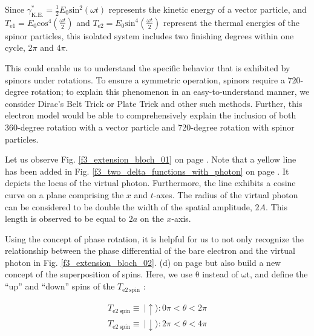 \documentclass[%
 reprint,
 amsmath,amssymb,
 aps,
]{revtex4-1}
\numberwithin{equation}{section}%
\begin{document}
    Since $\gamma^{*}_{\mathrm{K.E.}} = \frac{1}{2} E_{0} \mathrm{sin}^{2} (\omega t)$ represents the kinetic energy of a vector particle, and $T_{\mathrm{e1}} = E_{0} \mathrm{cos}^{4} \left ( \frac{\omega t}{2} \right)$ and $T_{\mathrm{e2}} = E_{0} \mathrm{sin}^{4} \left ( \frac{\omega t}{2} \right)$ represent the thermal energies of the spinor particles, this isolated system includes two finishing degrees within one cycle, $2\pi$ and $4\pi$.

    This could enable us to understand the specific behavior that is exhibited by spinors under rotations. To ensure a symmetric operation, spinors require a 720-degree rotation; to explain this phenomenon in an easy-to-understand manner, we consider Dirac’s Belt Trick or Plate Trick and other such methods. Further, this electron model would be able to comprehensively explain the inclusion of both 360-degree rotation with a vector particle and 720-degree rotation with spinor particles.

    Let us observe Fig. \ref{f3_extension_bloch_01} on page \pageref{f3_extension_bloch_01}. Note that a yellow line has been added in Fig. \ref{f3_two_delta_functions_with_photon}  on page \pageref{f3_two_delta_functions_with_photon}. It depicts the locus of the virtual photon. Furthermore, the line exhibits a cosine curve on a plane comprising the $x$ and $t$-axes. The radius of the virtual photon can be considered to be double the width of the spatial amplitude, $2A$. This length is observed to be equal to $2a$ on the $x$-axis.

    Using the concept of phase rotation, it is helpful for us to not only recognize the relationship between the phase differential of the bare electron and the virtual photon in Fig. \ref{f3_extension_bloch_02}. (d) on page \pageref{f3_extension_bloch_02} but also build a new concept of the superposition of spins. Here, we use $\mathrm{\theta}$ instead of $\mathrm{\omega t}$, and define the ``up'' and ``down'' spins of the $T_{\mathrm{e2 \ spin}}$ :
    
        \begin{equation}
            \begin{split}
                T_{\mathrm{e2 \ spin}} \equiv \ \mid \uparrow \rangle : 0 \pi < \theta < 2\pi \\
                T_{\mathrm{e2 \ spin}} \equiv \ \mid \downarrow \rangle : 2 \pi < \theta < 4\pi
            \end{split}
            \label{e3_spin_Te2}
        \end{equation}
\end{document}
